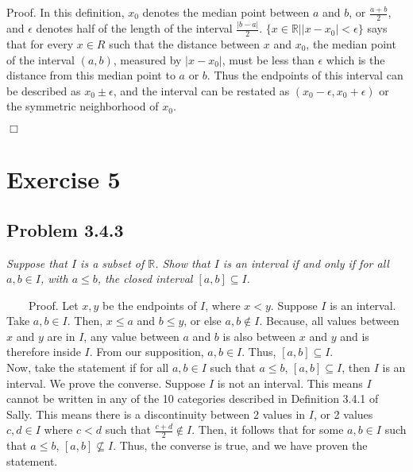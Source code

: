 \documentclass[
]{article}
\begin{document}
Proof. In this definition, \(x_0\) denotes the median point between
\(a\) and \(b\), or \(\frac{a + b}{2}\), and \(\epsilon\) denotes half
of the length of the interval \(\frac{|b - a|}{2}\).
\(\{x\in \mathbb{R}||x−x_0|<\epsilon\}\) says that for every \(x \in R\)
such that the distance between \(x\) and \(x_0\), the median point of
the interval \((a, b)\), measured by \(|x−x_0|\), must be less than
\(\epsilon\) which is the distance from this median point to \(a\) or
\(b\). Thus the endpoints of this interval can be described as
\(x_0 \pm \epsilon\), and the interval can be restated as
\((x_0 - \epsilon, x_0 + \epsilon)\) or the symmetric neighborhood of
\(x_0\).

\hfill \(\Box\)

\hypertarget{exercise-5}{%
\section{Exercise 5}\label{exercise-5}}

\hypertarget{problem-3.4.3}{%
\subsection{Problem 3.4.3}\label{problem-3.4.3}}

\emph{Suppose that \(I\) is a subset of \(\mathbb{R}\). Show that \(I\)
is an interval if and only if for all \(a, b \in I\), with \(a \leq b\),
the closed interval \([a, b] \subseteq I\).}

~~~~Proof. Let \(x, y\) be the endpoints of \(I\), where \(x < y\).
Suppose \(I\) is an interval. Take \(a, b \in I\). Then, \(x \leq a\)
and \(b \leq y\), or else \(a, b \notin I\). Because, all values between
\(x\) and \(y\) are in \(I\), any value between \(a\) and \(b\) is also
between \(x\) and \(y\) and is therefore inside \(I\). From our
supposition, \(a, b \in I\). Thus, \([a, b] \subseteq I\).\\
\hspace*{0.333em}\hspace*{0.333em}\hspace*{0.333em}\hspace*{0.333em}Now,
take the statement if for all \(a, b \in I\) such that \(a \leq b\),
\([a, b] \subseteq I\), then \(I\) is an interval. We prove the
converse. Suppose \(I\) is not an interval. This means \(I\) cannot be
written in any of the 10 categories described in Definition 3.4.1 of
Sally. This means there is a discontinuity between 2 values in \(I\), or
2 values \(c, d \in I\) where \(c < d\) such that
\(\frac{c + d}{2} \notin I\). Then, it follows that for some
\(a, b \in I\) such that \(a \leq b\), \([a, b] \nsubseteq I\). Thus,
the converse is true, and we have proven the statement.
\end{document}
